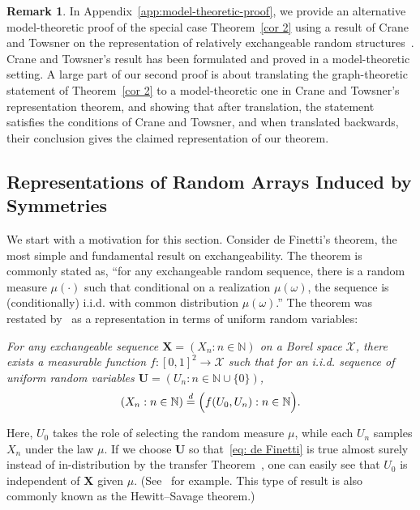 \documentclass[10pt]{amsart}
\theoremstyle{definition}\newtheorem{defi}[theo]{Definition}\newtheorem{rema}[theo]{Remark}\newtheorem{exam}[theo]{Example}\newtheorem{exem}[theo]{Example}\newtheorem{nota}[theo]{Notation}
\renewcommand{\d}{\buildrel{d}\over{=}}
\newcommand*\N{\mathbb{N}}
\newcommand*\XX{{\mathcal{X}}}
\newcommand*\bU{\mathbf{U}}
\newcommand*\bX{\mathbf{X}}
\begin{document}
\begin{rema}
In Appendix~\ref{app:model-theoretic-proof}, we provide an alternative model-theoretic proof of the special case Theorem~\ref{cor 2} using a result of Crane and Towsner on the representation of relatively exchangeable random structures~\cite{crane2017relative}. Crane and Towsner's result has been formulated and proved in a model-theoretic setting. A large part of our second proof is about translating the graph-theoretic statement of Theorem~\ref{cor 2} to a model-theoretic one in Crane and Towsner's representation theorem, and showing that after translation, the statement satisfies the conditions of Crane and Towsner, and when translated backwards, their conclusion gives the claimed representation of our theorem.
\end{rema}


\subsection{Representations of Random Arrays Induced by Symmetries}\label{sec: symmetry rv S}
We start with a motivation for this section. Consider de Finetti's theorem, the most simple and fundamental result on exchangeability. The theorem is commonly stated as, ``for any exchangeable random sequence, there is a random measure $\mu(\cdot)$ such that conditional on a realization $\mu(\omega)$, the sequence is (conditionally) i.i.d. with common distribution $\mu(\omega)$.'' The theorem was restated by~\cite{aldous1981representations} as a representation in terms of uniform random variables:

\emph{For any exchangeable sequence $\bX = (X_n : n \in \N)$ on a Borel space $\XX$, there exists a measurable function $f:[0,1]^2 \to \XX$ such that for an i.i.d. sequence of uniform random variables $\bU=(U_n : n \in \N \cup \{0\})$,}
\begin{equation}\label{eq: de Finetti}
(X_n : n \in \N) \d \Big(f(U_0, U_n) : n \in \N \Big).
\end{equation}


Here, $U_0$ takes the role of selecting the random measure $\mu$, while each $U_n$ samples $X_n$ under the law $\mu$. If we choose $\bU$ so that~\eqref{eq: de Finetti} is true almost surely instead of in-distribution by the transfer Theorem~\cite[Theorem~6.10]{kallenberg2002foundations}, one can easily see that $U_0$ is independent of $\bX$ given $\mu$. (See~\cite[Lemma~7.1 and Theorem~1.1]{kallenberg2006probabilistic} for example. This type of result is also commonly known as the Hewitt--Savage theorem.)
\end{document}
